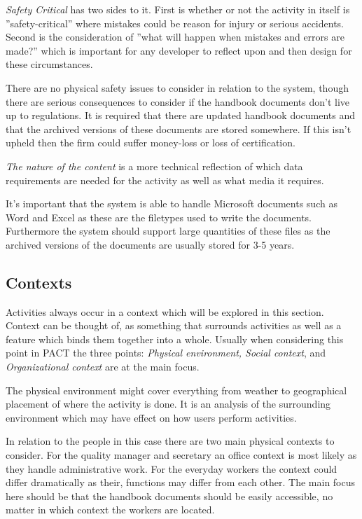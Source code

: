 \textit{Safety Critical} has two sides to it.
First is whether or not the activity in itself is ''safety-critical'' where mistakes could be reason for injury or serious accidents.
Second is the consideration of ''what will happen when mistakes and errors are made?'' which is important for any developer to reflect upon and then design for these circumstances.
\citep{Benyon}

There are no physical safety issues to consider in relation to the system, though there are serious consequences to consider if the handbook documents don't live up to regulations. 
It is required that there are updated handbook documents and that the archived versions of these documents are stored somewhere. 
If this isn't upheld then the firm could suffer money-loss or loss of certification.

\textit{The nature of the content} is a more technical reflection of which data requirements are needed for the activity as well as what media it requires.
\citep{Benyon}

It's important that the system is able to handle Microsoft documents such as Word and Excel as these are the filetypes used to write the documents.
Furthermore the system should support large quantities of these files as the archived versions of the documents are usually stored for 3-5 years.

\subsection{Contexts}
Activities always occur in a context which will be explored in this section.
Context can be thought of, as something that surrounds activities as well as a feature which binds them together into a whole.
Usually when considering this point in PACT the three points: \textit{Physical environment, Social context}, and \textit{Organizational context} are at the main focus.
\citep{Benyon}

The physical environment might cover everything from weather to geographical placement of where the activity is done. 
It is an analysis of the surrounding environment which may have effect on how users perform activities.
\citep{Benyon}

In relation to the people in this case there are two main physical contexts to consider. 
For the quality manager and secretary an office context is most likely as they handle administrative work. 
For the everyday workers the context could differ dramatically as their, functions may differ from each other.
The main focus here should be that the handbook documents should be easily accessible, no matter in which context the workers are located.

